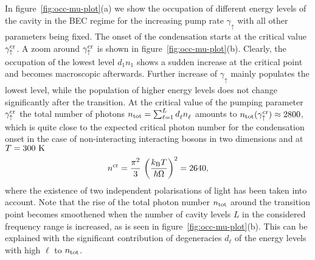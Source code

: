 \documentclass[12pt, a4paper]{iopart}
\begin{document}
In figure~\ref{fig:occ-mu-plot}(a) we show the occupation of different energy levels of the cavity in the BEC regime for the increasing pump rate $\gamma_\uparrow$ with all other parameters being fixed. The onset of the condensation starts at the critical value $\gamma_\uparrow^{\rm cr}$. A zoom around $\gamma_\uparrow^{\rm cr}$ is shown in figure~\ref{fig:occ-mu-plot}(b). Clearly, the occupation of the lowest level $d_1 n_1$ shows a sudden increase at the critical point and becomes macroscopic afterwards. Further increase of $\gamma_\uparrow$ mainly populates the lowest level, while the population of higher energy levels does not change significantly after the transition. At the critical value of the pumping parameter $\gamma_\uparrow^{\rm cr}$ the total number of photons $n_{\rm tot} = \sum_{\ell=1}^{L} d_\ell^{} n_\ell^{}$ amounts to $n_{\rm tot}(\gamma_\uparrow^{\rm cr}) \approx 2800$, which is quite close to the expected critical photon number for the condensation onset in the case of non-interacting interacting bosons in two dimensions \cite{Pethick-Smith,Pitaevskii-BEC} and at $T=300~{\rm K}$
\begin{equation}
\label{eq:phot_crit_cond}
n^{\rm cr} = \frac{\pi^2}{3} \, \left(\frac{k_{\rm B} T}{\hbar \Omega }\right)^2 = 2640,
\end{equation}
where the existence of two independent polarisations of light has been taken into account. Note that the rise of the total photon number $n_{\rm tot}$ around the transition point becomes smoothened when the number of cavity levels $L$ in the considered frequency range is increased, as is seen in figure~\ref{fig:occ-mu-plot}(b). This can be explained with the significant contribution of degeneracies $d_\ell^{}$ of the energy levels with high $\ell$ to $n_{\rm tot}$.
\end{document}
